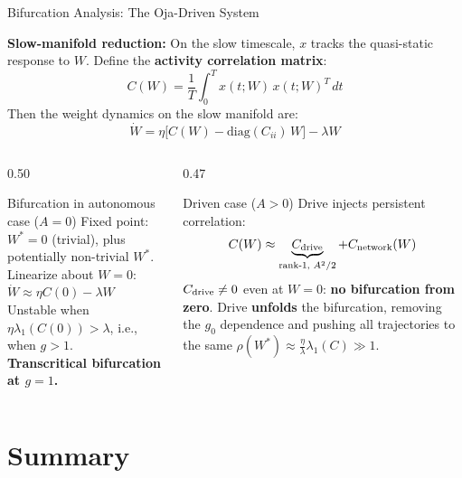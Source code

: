 \documentclass[11pt,aspectratio=169]{beamer}
\begin{document}
\begin{frame}{Bifurcation Analysis: The Oja-Driven System}

\textbf{Slow-manifold reduction:} On the slow timescale, $x$ tracks the quasi-static response to $W$. Define the \textbf{activity correlation matrix}:
\[
C(W) = \frac{1}{T}\int_0^T x(t;W)\,x(t;W)^T\,dt
\]
Then the weight dynamics on the slow manifold are:
\[
\dot{W} = \eta\bigl[C(W) - \mathrm{diag}(C_{ii})\,W\bigr] - \lambda W
\]

\begin{columns}[T]
\begin{column}{0.50\textwidth}
\begin{block}{Bifurcation in autonomous case ($A=0$)}
Fixed point: $W^* = 0$ (trivial), plus potentially non-trivial $W^*$.\\
Linearize about $W=0$:
$\dot{W} \approx \eta C(0) - \lambda W$\\
Unstable when $\eta\lambda_1(C(0)) > \lambda$, i.e., when $g > 1$.\\
\textbf{Transcritical bifurcation at $g = 1$.}
\end{block}
\end{column}
\begin{column}{0.47\textwidth}
\begin{alertblock}{Driven case ($A > 0$)}
Drive injects persistent correlation:
\[
C(W) \approx \underbrace{C_{\rm drive}}_{\text{rank-1, }A^2/2} + C_{\rm network}(W)
\]
$C_{\rm drive} \ne 0$ even at $W=0$: \textbf{no bifurcation from zero}.
Drive \textbf{unfolds} the bifurcation, removing the $g_0$ dependence and pushing all trajectories to the same $\rho(W^*) \approx \frac{\eta}{\lambda}\lambda_1(C) \gg 1$.
\end{alertblock}
\end{column}
\end{columns}
\end{frame}

\section{Summary}
\end{document}
